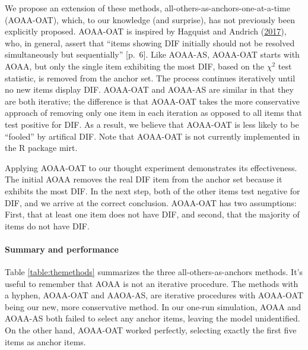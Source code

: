 \documentclass[
  11pt,
]{article}
\begin{document}
We propose an extension of these methods, all-others-as-anchors-one-at-a-time (AOAA-OAT), which, to our knowledge (and surprise), has not previously been explicitly proposed. AOAA-OAT is inspired by Hagquist and Andrich (\protect\hyperlink{ref-hagquist2017recent}{2017}), who, in general, assert that \enquote{items showing DIF initially should not be resolved simultaneously but sequentially} {[}p.~6{]}. Like AOAA-AS, AOAA-OAT starts with AOAA, but only the single item exhibiting the most DIF, based on the \(\chi^2\) test statistic, is removed from the anchor set. The process continues iteratively until no new items display DIF. AOAA-OAT and AOAA-AS are similar in that they are both iterative; the difference is that AOAA-OAT takes the more conservative approach of removing only one item in each iteration as opposed to all items that test positive for DIF. As a result, we believe that AOAA-OAT is less likely to be \enquote{fooled} by artifical DIF. Note that AOAA-OAT is not currently implemented in the R package mirt.

Applying AOAA-OAT to our thought experiment demonstrates its effectiveness. The initial AOAA removes the real DIF item from the anchor set because it exhibits the most DIF. In the next step, both of the other items test negative for DIF, and we arrive at the correct conclusion. AOAA-OAT has two assumptions: First, that at least one item does not have DIF, and second, that the majority of items do not have DIF.

\hypertarget{summary-and-performance}{%
\paragraph{Summary and performance}\label{summary-and-performance}}

Table \ref{table:themethods} summarizes the three all-others-as-anchors methods. It's useful to remember that AOAA is not an iterative procedure. The methods with a hyphen, AOAA-OAT and AAOA-AS, are iterative procedures with AOAA-OAT being our new, more conservative method. In our one-run simulation, AOAA and AOAA-AS both failed to select any anchor items, leaving the model unidentified. On the other hand, AOAA-OAT worked perfectly, selecting exactly the first five items as anchor items.
\end{document}
